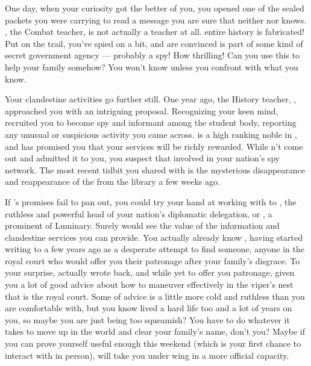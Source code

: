 \documentclass[char]{GL2020}
\begin{document}
One day, when your curiosity got the better of you, you opened one of the sealed packets you were carrying to read a message you are sure that neither \cEthics{} nor \cChupSecond{} knows. \cInterpol{\full}, the Combat teacher, is not actually a teacher at all. \cInterpol{\Their} entire history is fabricated! Put on the trail, you've spied on \cInterpol{} a bit, and are convinced \cInterpol{} is part of some kind of secret government agency — probably a spy! How thrilling! Can you use this to help your family somehow? You won't know unless you confront \cInterpol{\them} with what you know.

Your clandestine activities go further still. One year ago, the History teacher, \cHistory{\full}, approached you with an intriguing proposal. Recognizing your keen mind, \cHistory{\they} recruited you to become \cHistory{\their} spy and informant among the student body, reporting any unusual or suspicious activity you came across. \cHistory{} is a high ranking noble in \pFarm{}, and has promised you that your services will be richly rewarded. While \cHistory{\theyhave}n't come out and admitted it to you, you suspect that \cHistory{\theyare} involved in your nation's spy network. The most recent tidbit you shared with \cHistory{\them} is the mysterious disappearance and reappearance of the \iScythe{} from the library a few weeks ago.

If \cHistory{}'s promises fail to pan out, you could try your hand at working with to \cEvil{\full}, the ruthless and powerful head of your nation’s diplomatic delegation, or \cHedonist{\full}, a prominent \cHedonist{\cleric} of Luminary. Surely \cEvil{\they} would see the value of the information and clandestine services you can provide. You actually already know \cEvil{}, having started writing to \cEvil{\them} a few years ago as a desperate attempt to find someone, anyone in the royal court who would offer you their patronage after your family’s disgrace. To your surprise, \cEvil{\they} actually wrote back, and while \cEvil{\theyhave} yet to offer you patronage, \cEvil{\theyhave} given you a lot of good advice about how to maneuver effectively in the viper’s nest that is the royal court. Some of \cEvil{\their} advice is a little more cold and ruthless than you are comfortable with, but you know \cEvil{\they} \cEvil{\have} lived a hard life too and \cEvil{\have} a lot of years on you, so maybe you are just being too squeamish? You have to do whatever it takes to move up in the world and clear your family’s name, don’t you? Maybe if you can prove yourself useful enough this weekend (which is your first chance to interact with \cEvil{} in person), \cEvil{\they} will take you under \cEvil{\their} wing in a more official capacity.
\end{document}
